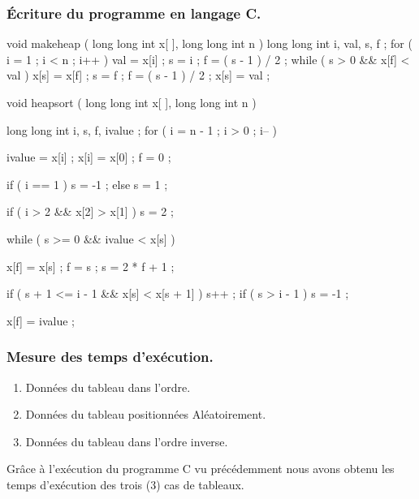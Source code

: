 \documentclass[12pt]{article}
\begin{document}
\subsubsection{Écriture du programme en langage C.}
\begin{sql}
void makeheap ( long long int x[ ], long long int n )
{
   long long  int i, val, s, f ;
    for ( i = 1 ; i < n ; i++ )
    {
        val = x[i] ;
        s = i ;
        f = ( s - 1 ) / 2 ;
        while ( s > 0 && x[f] < val )
        {
            x[s] = x[f] ;
            s = f ;
            f = ( s - 1 ) / 2 ;
        }
        x[s] = val ;
    }
}

void heapsort ( long long int x[ ], long long int n )
{
    long long int i, s, f, ivalue ;
    for ( i = n - 1 ; i > 0 ; i-- )
    {
        ivalue = x[i] ;
        x[i] = x[0] ;
        f = 0 ;

        if ( i == 1 ) s = -1 ;
        else s = 1 ;

        if ( i > 2 && x[2] > x[1] )  s = 2 ;

        while ( s >= 0 && ivalue < x[s] )
        {
            x[f] = x[s] ;
            f = s ;
            s = 2 * f + 1 ;

            if ( s + 1 <= i - 1 && x[s] < x[s + 1] ) s++ ;
            if ( s > i - 1 )  s = -1 ;
        }
        x[f] = ivalue ;
    }
}
\end{sql}

\subsubsection{Mesure des temps d'exécution.}
\begin{enumerate}
	\item Données du tableau dans l'ordre.
	\item Données du tableau positionnées Aléatoirement.
	\item Données du tableau dans l'ordre inverse.
\end{enumerate}
Grâce à l'exécution du programme C vu précédemment nous avons obtenu les temps d'exécution des trois (3) cas de tableaux.
\end{document}
